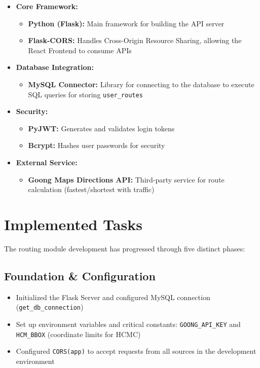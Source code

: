 \begin{itemize}
    \item \textbf{Core Framework:}
    \begin{itemize}
        \item \textbf{Python (Flask):} Main framework for building the API server
        \item \textbf{Flask-CORS:} Handles Cross-Origin Resource Sharing, allowing the React Frontend to consume APIs
    \end{itemize}
    
    \item \textbf{Database Integration:}
    \begin{itemize}
        \item \textbf{MySQL Connector:} Library for connecting to the database to execute SQL queries for storing \texttt{user\_routes}
    \end{itemize}
    
    \item \textbf{Security:}
    \begin{itemize}
        \item \textbf{PyJWT:} Generates and validates login tokens
        \item \textbf{Bcrypt:} Hashes user passwords for security
    \end{itemize}
    
    \item \textbf{External Service:}
    \begin{itemize}
        \item \textbf{Goong Maps Directions API:} Third-party service for route calculation (fastest/shortest with traffic)
    \end{itemize}
\end{itemize}

\section{Implemented Tasks}

The routing module development has progressed through five distinct phases:

\subsection{Foundation \& Configuration}

\begin{itemize}
    \item Initialized the Flask Server and configured MySQL connection (\texttt{get\_db\_connection})
    \item Set up environment variables and critical constants: \texttt{GOONG\_API\_KEY} and \texttt{HCM\_BBOX} (coordinate limits for HCMC)
    \item Configured \texttt{CORS(app)} to accept requests from all sources in the development environment
\end{itemize}

